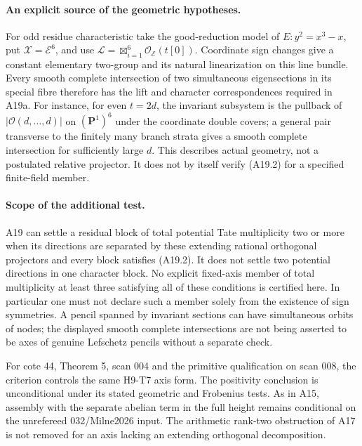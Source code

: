 \documentclass[11pt]{article}
\theoremstyle{remark}\newtheorem{remark}[theorem]{Remark}
\begin{document}
\paragraph{An explicit source of the geometric hypotheses.}
For odd residue characteristic take the good-reduction
model of $E:y^2=x^3-x$, put $\mathcal X=\mathcal E^6$,
and use $\mathcal L=\boxtimes_{i=1}^6\mathcal O_{\mathcal E}(t[0])$.
Coordinate sign changes give a constant elementary
two-group and its natural linearization on this line
bundle. Every smooth complete intersection of two
simultaneous eigensections in its special fibre
therefore has the lift and character correspondences
required in A19a. For instance, for even $t=2d$,
the invariant subsystem is the pullback of
$|\mathcal O(d,\ldots,d)|$ on $(\mathbf P^1)^6$ under
the coordinate double covers; a general pair transverse
to the finitely many branch strata gives a smooth
complete intersection for sufficiently large $d$.
This describes actual geometry, not a postulated
relative projector. It does not by itself verify
(A19.2) for a specified finite-field member.

\paragraph{Scope of the additional test.}
A19 can settle a residual block of total potential
Tate multiplicity two or more when its directions
are separated by these extending rational orthogonal
projectors and every block satisfies (A19.2).
It does not settle two potential directions in one
character block. No explicit fixed-axis member of
total multiplicity at least three satisfying all of
these conditions is certified here. In particular
one must not declare such a member solely from the
existence of sign symmetries. A pencil spanned by
invariant sections can have simultaneous orbits of
nodes; the displayed smooth complete intersections
are not being asserted to be axes of genuine
Lefschetz pencils without a separate check.

For cote 44, Theorem 5, scan 004 and the primitive
qualification on scan 008, the criterion controls
the same H9-T7 axis form. The positivity conclusion
is unconditional under its stated geometric and
Frobenius tests. As in A15, assembly with the separate
abelian term in the full height remains conditional
on the unrefereed 032/Milne2026 input. The arithmetic
rank-two obstruction of A17 is not removed for an
axis lacking an extending orthogonal decomposition.

\end{document}
